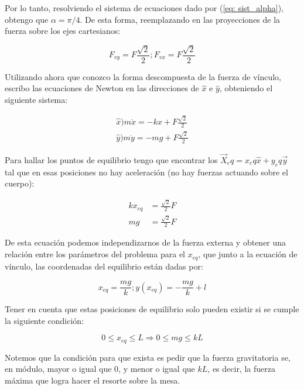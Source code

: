 \documentclass{article}
\begin{document}
\begin{multicols}{2}
Por lo tanto, resolviendo el sistema de ecuaciones dado por (\ref{eq: sist_alpha}), obtengo que $\alpha = \pi/4$. De esta forma, reemplazando en las proyecciones de la fuerza sobre los ejes cartesianos:

\begin{equation}
    F_{vy} = F \frac{\sqrt{2}}{2}; F_{vx} = F \frac{\sqrt{2}}{2}
\end{equation}

Utilizando ahora que conozco la forma descompuesta de la fuerza de vínculo, escribo las ecuaciones de Newton en las direcciones de $\hat{x}$ e $\hat{y}$, obteniendo el siguiente sistema:

\begin{equation}
\begin{split}
    \hat{x}\big) m\ddot{x} = -kx + F\frac{\sqrt{2}}{2} \\
    \hat{y}\big) m\ddot{y} = -mg + F\frac{\sqrt{2}}{2}
\end{split}
\end{equation}

Para hallar los puntos de equilibrio tengo que encontrar los $\vec{X}_eq = x_eq \hat{x} + y_eq \vec{y}$ tal que en esas posiciones no hay aceleración (no hay fuerzas actuando sobre el cuerpo):

\begin{equation}
\begin{split}
    kx_{eq} &= \frac{\sqrt{2}}{2}F \\
    mg &= \frac{\sqrt{2}}{2}F
\end{split}
\end{equation}

De esta ecuación podemos independizarnos de la fuerza externa y obtener una relación entre los parámetros del problema para el $x_{eq}$, que junto a la ecuación de vínculo, las coordenadas del equilibrio están dadas por:

\begin{equation}
    x_{eq} = \frac{mg}{k} ; y(x_{eq}) = -\frac{mg}{k} + l
\end{equation}

Tener en cuenta que estas posiciones de equilibrio solo pueden existir si se cumple la siguiente condición:

\begin{equation}
    0 \leq x_{eq} \leq L \Rightarrow 0 \leq mg \leq kL
\end{equation}

Notemos que la condición para que exista es pedir que la fuerza gravitatoria se, en módulo, mayor o igual que $0$, y menor o igual que $kL$, es decir, la fuerza máxima que logra hacer el resorte sobre la mesa.


\end{multicols}
\end{document}
